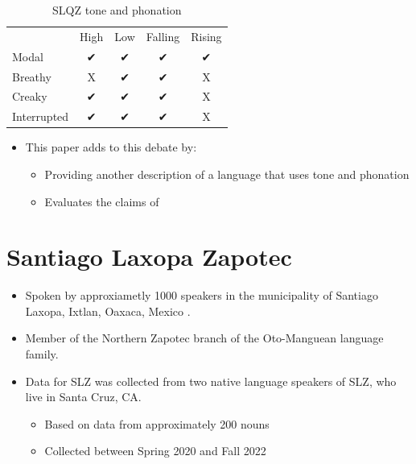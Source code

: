 \documentclass[12pt, letterpaper]{article}
\providecommand{\lsptoprule}{\midrule\toprule}
\providecommand{\lspbottomrule}{\bottomrule\midrule}
\begin{document}
\begin{table}[!ht]
	\centering
	\caption{SLQZ tone and phonation}
	\label{tab:SLQZ}
	 \begin{tabular}{lcccc}
	  \lsptoprule
					  &	 High  & Low & Falling & Rising \\
		  Modal	& ✔︎ & ✔︎ & ✔︎ & ✔︎ \\
		  Breathy & X & ✔︎ & ✔︎ & X \\
		  Creaky & ✔︎ & ✔︎ & ✔︎ & X \\
		  Interrupted & ✔︎ & ✔︎ & ✔︎ & X \\
	  \lspbottomrule
	 \end{tabular}
	\end{table}
\begin{itemize}
	\item This paper adds to this debate by:
	\begin{itemize}
		\item Providing another description of a language that uses tone and phonation
		\item Evaluates the claims of \citet{silvermanLaryngealComplexityOtomanguean1997}
	\end{itemize}
\end{itemize}



\section{Santiago Laxopa Zapotec} \label{sec:SLZ}

\begin{itemize}
	\item Spoken by approxiametly 1000 speakers in the municipality of Santiago Laxopa, Ixtlan, Oaxaca, Mexico \citep{adlerAcousticsPhonationTypes2016,adlerDerivationVerbInitiality2018,foleyForbiddenCliticClusters2018,foleyExtendingPersonCaseConstraint2020}. 
	\item Member of the Northern Zapotec branch of the Oto-Manguean language family.
	\item Data for SLZ was collected from two native language speakers of SLZ, who live in Santa Cruz, CA. 
	\begin{itemize}
		\item Based on data from approximately 200 nouns
		\item Collected between Spring 2020 and Fall 2022
	\end{itemize}
\end{itemize}
\end{document}
